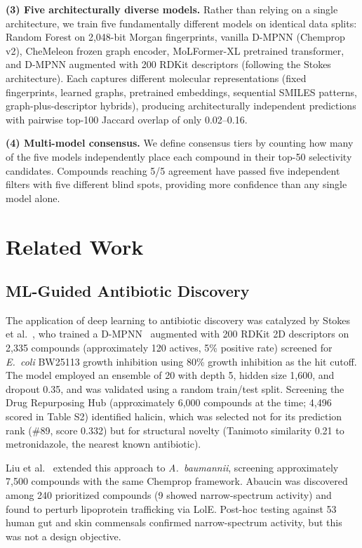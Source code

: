 \documentclass{article}
\begin{document}
\textbf{(3) Five architecturally diverse models.}
Rather than relying on a single architecture, we train five fundamentally different models on identical data splits: Random Forest on 2,048-bit Morgan fingerprints, vanilla D-MPNN (Chemprop v2), CheMeleon frozen graph encoder, MoLFormer-XL pretrained transformer, and D-MPNN augmented with 200 RDKit descriptors (following the Stokes architecture).
Each captures different molecular representations (fixed fingerprints, learned graphs, pretrained embeddings, sequential SMILES patterns, graph-plus-descriptor hybrids), producing architecturally independent predictions with pairwise top-100 Jaccard overlap of only 0.02--0.16.

\textbf{(4) Multi-model consensus.}
We define consensus tiers by counting how many of the five models independently place each compound in their top-50 selectivity candidates.
Compounds reaching 5/5 agreement have passed five independent filters with five different blind spots, providing more confidence than any single model alone.

\section{Related Work}
\label{sec:related}

\subsection{ML-Guided Antibiotic Discovery}

The application of deep learning to antibiotic discovery was catalyzed by Stokes et al.~\citep{stokes2020}, who trained a D-MPNN~\citep{yang2019} augmented with 200 RDKit 2D descriptors on 2,335 compounds (approximately 120 actives, 5\% positive rate) screened for \textit{E.~coli} BW25113 growth inhibition using 80\% growth inhibition as the hit cutoff.
The model employed an ensemble of 20 with depth 5, hidden size 1,600, and dropout 0.35, and was validated using a random train/test split.
Screening the Drug Repurposing Hub (approximately 6,000 compounds at the time; 4,496 scored in Table S2) identified halicin, which was selected not for its prediction rank (\#89, score 0.332) but for structural novelty (Tanimoto similarity 0.21 to metronidazole, the nearest known antibiotic).

Liu et al.~\citep{liu2023} extended this approach to \textit{A.~baumannii}, screening approximately 7,500 compounds with the same Chemprop framework.
Abaucin was discovered among 240 prioritized compounds (9 showed narrow-spectrum activity) and found to perturb lipoprotein trafficking via LolE.
Post-hoc testing against 53 human gut and skin commensals confirmed narrow-spectrum activity, but this was not a design objective.
\end{document}
